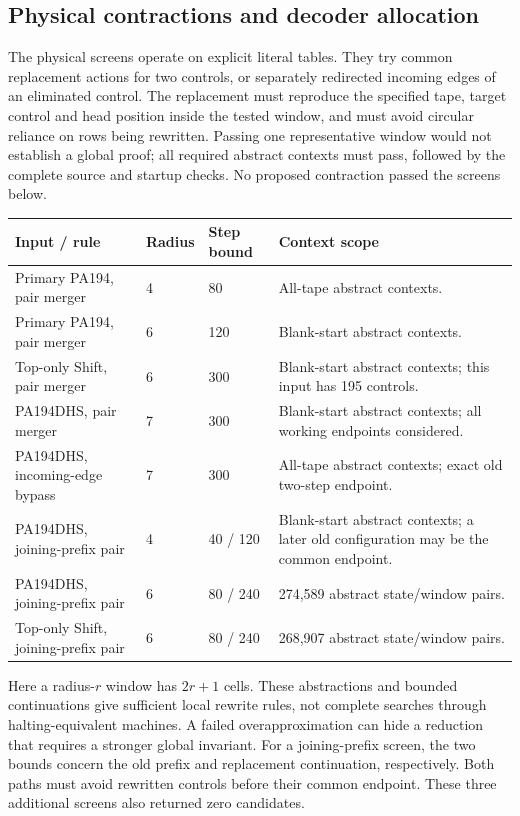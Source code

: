 \subsection{Physical contractions and decoder allocation}

The physical screens operate on explicit literal tables. They try common
replacement actions for two controls, or separately redirected incoming
edges of an eliminated control. The replacement must reproduce the
specified tape, target control and head position inside the tested window,
and must avoid circular reliance on rows being rewritten. Passing one
representative window would not establish a global proof; all required
abstract contexts must pass, followed by the complete source and startup
checks. No proposed contraction passed the screens below.

\begin{center}\small
\begin{tabularx}{\linewidth}{@{}p{.24\linewidth}p{.14\linewidth}p{.18\linewidth}X@{}}
\toprule Input / rule & Radius & Step bound & Context scope\\\midrule
Primary PA194, pair merger & 4 & 80 & All-tape abstract contexts.\\
Primary PA194, pair merger & 6 & 120 & Blank-start abstract contexts.\\
Top-only Shift, pair merger & 6 & 300 & Blank-start abstract contexts; this input has 195 controls.\\
PA194DHS, pair merger & 7 & 300 & Blank-start abstract contexts; all working endpoints considered.\\
PA194DHS, incoming-edge bypass & 7 & 300 & All-tape abstract contexts; exact old two-step endpoint.\\
PA194DHS, joining-prefix pair & 4 & 40 / 120 & Blank-start abstract contexts; a later old configuration may be the common endpoint.\\
PA194DHS, joining-prefix pair & 6 & 80 / 240 & 274,589 abstract state/window pairs.\\
Top-only Shift, joining-prefix pair & 6 & 80 / 240 & 268,907 abstract state/window pairs.\\\bottomrule
\end{tabularx}\end{center}
Here a radius-$r$ window has $2r+1$ cells. These abstractions and bounded
continuations give sufficient local rewrite rules, not complete searches
through halting-equivalent machines. A failed overapproximation can hide
a reduction that requires a stronger global invariant.
For a joining-prefix screen, the two bounds concern the old prefix and
replacement continuation, respectively. Both paths must avoid rewritten
controls before their common endpoint. These three additional screens
also returned zero candidates.

